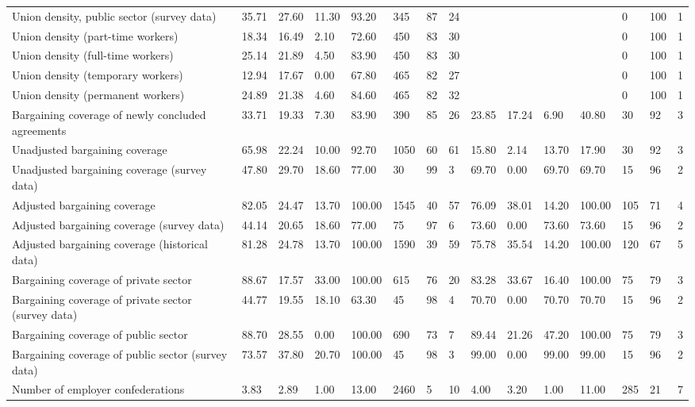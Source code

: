 \begin{longtable}{lllllllllllllll}
Union density, public sector (survey data) & 35.71 & 27.60 & 11.30 & 93.20 & 345 & 87 & 24 &  &  &  &  & 0 & 100 & 1\\
Union density (part-time workers) & 18.34 & 16.49 & 2.10 & 72.60 & 450 & 83 & 30 &  &  &  &  & 0 & 100 & 1\\
Union density (full-time workers) & 25.14 & 21.89 & 4.50 & 83.90 & 450 & 83 & 30 &  &  &  &  & 0 & 100 & 1\\
Union density (temporary workers) & 12.94 & 17.67 & 0.00 & 67.80 & 465 & 82 & 27 &  &  &  &  & 0 & 100 & 1\\
\addlinespace
Union density (permanent workers) & 24.89 & 21.38 & 4.60 & 84.60 & 465 & 82 & 32 &  &  &  &  & 0 & 100 & 1\\
Bargaining coverage of newly concluded agreements & 33.71 & 19.33 & 7.30 & 83.90 & 390 & 85 & 26 & 23.85 & 17.24 & 6.90 & 40.80 & 30 & 92 & 3\\
Unadjusted bargaining coverage & 65.98 & 22.24 & 10.00 & 92.70 & 1050 & 60 & 61 & 15.80 & 2.14 & 13.70 & 17.90 & 30 & 92 & 3\\
Unadjusted bargaining coverage (survey data) & 47.80 & 29.70 & 18.60 & 77.00 & 30 & 99 & 3 & 69.70 & 0.00 & 69.70 & 69.70 & 15 & 96 & 2\\
Adjusted bargaining coverage & 82.05 & 24.47 & 13.70 & 100.00 & 1545 & 40 & 57 & 76.09 & 38.01 & 14.20 & 100.00 & 105 & 71 & 4\\
\addlinespace
Adjusted bargaining coverage (survey data) & 44.14 & 20.65 & 18.60 & 77.00 & 75 & 97 & 6 & 73.60 & 0.00 & 73.60 & 73.60 & 15 & 96 & 2\\
Adjusted bargaining coverage (historical data) & 81.28 & 24.78 & 13.70 & 100.00 & 1590 & 39 & 59 & 75.78 & 35.54 & 14.20 & 100.00 & 120 & 67 & 5\\
Bargaining coverage of private sector & 88.67 & 17.57 & 33.00 & 100.00 & 615 & 76 & 20 & 83.28 & 33.67 & 16.40 & 100.00 & 75 & 79 & 3\\
Bargaining coverage of private sector (survey data) & 44.77 & 19.55 & 18.10 & 63.30 & 45 & 98 & 4 & 70.70 & 0.00 & 70.70 & 70.70 & 15 & 96 & 2\\
Bargaining coverage of public sector & 88.70 & 28.55 & 0.00 & 100.00 & 690 & 73 & 7 & 89.44 & 21.26 & 47.20 & 100.00 & 75 & 79 & 3\\
\addlinespace
Bargaining coverage of public sector (survey data) & 73.57 & 37.80 & 20.70 & 100.00 & 45 & 98 & 3 & 99.00 & 0.00 & 99.00 & 99.00 & 15 & 96 & 2\\
Number of employer confederations & 3.83 & 2.89 & 1.00 & 13.00 & 2460 & 5 & 10 & 4.00 & 3.20 & 1.00 & 11.00 & 285 & 21 & 7\\

\end{longtable}
